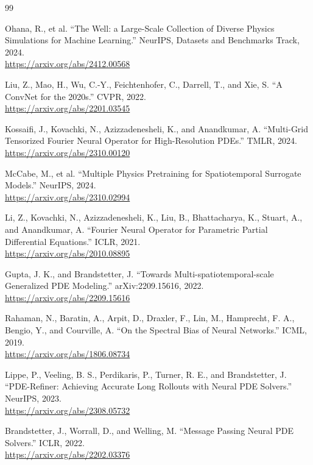 \documentclass[11pt]{article}
\begin{document}
\begin{thebibliography}{99}
\setlength{\itemsep}{8pt}

Ohana, R., et al.
``The Well: a Large-Scale Collection of Diverse Physics Simulations for Machine Learning.''
NeurIPS, Datasets and Benchmarks Track, 2024.\\
\url{https://arxiv.org/abs/2412.00568}

Liu, Z., Mao, H., Wu, C.-Y., Feichtenhofer, C., Darrell, T., and Xie, S.
``A ConvNet for the 2020s.''
CVPR, 2022.\\
\url{https://arxiv.org/abs/2201.03545}

Kossaifi, J., Kovachki, N., Azizzadenesheli, K., and Anandkumar, A.
``Multi-Grid Tensorized Fourier Neural Operator for High-Resolution PDEs.''
TMLR, 2024.\\
\url{https://arxiv.org/abs/2310.00120}

McCabe, M., et al.
``Multiple Physics Pretraining for Spatiotemporal Surrogate Models.''
NeurIPS, 2024.\\
\url{https://arxiv.org/abs/2310.02994}

Li, Z., Kovachki, N., Azizzadenesheli, K., Liu, B., Bhattacharya, K., Stuart, A., and Anandkumar, A.
``Fourier Neural Operator for Parametric Partial Differential Equations.''
ICLR, 2021.\\
\url{https://arxiv.org/abs/2010.08895}

Gupta, J. K., and Brandstetter, J.
``Towards Multi-spatiotemporal-scale Generalized PDE Modeling.''
arXiv:2209.15616, 2022.\\
\url{https://arxiv.org/abs/2209.15616}

Rahaman, N., Baratin, A., Arpit, D., Draxler, F., Lin, M., Hamprecht, F. A., Bengio, Y., and Courville, A.
``On the Spectral Bias of Neural Networks.''
ICML, 2019.\\
\url{https://arxiv.org/abs/1806.08734}

Lippe, P., Veeling, B. S., Perdikaris, P., Turner, R. E., and Brandstetter, J.
``PDE-Refiner: Achieving Accurate Long Rollouts with Neural PDE Solvers.''
NeurIPS, 2023.\\
\url{https://arxiv.org/abs/2308.05732}

Brandstetter, J., Worrall, D., and Welling, M.
``Message Passing Neural PDE Solvers.''
ICLR, 2022.\\
\url{https://arxiv.org/abs/2202.03376}


\end{thebibliography}
\end{document}
